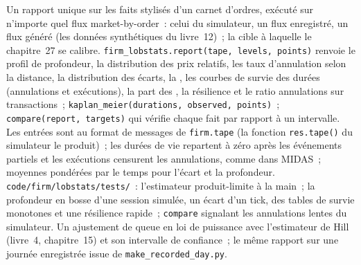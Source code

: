\begin{build}
 Un rapport unique sur les faits stylisés d'un carnet d'ordres, exécuté sur n'importe quel flux market-by-order~: celui du simulateur, un flux enregistré, un flux généré
(les données synthétiques du livre~12)~; la cible à laquelle le chapitre~27 se calibre.
 \texttt{firm\_lobstats.report(tape, levels, points)} renvoie le profil de profondeur, la distribution des prix relatifs,
les taux d'annulation selon la distance, la distribution des écarts, la , les courbes de survie des durées (annulations et exécutions), la part des ,
la résilience et le ratio annulations sur transactions~; \texttt{kaplan\_meier(durations, observed, points)}~; \texttt{compare(report, targets)} qui vérifie chaque fait
par rapport à un intervalle.
 Les entrées sont au format de messages de \texttt{firm.tape} (la fonction \texttt{res.tape()} du simulateur le produit)~; les durées de vie repartent à zéro après les événements partiels et
les exécutions censurent les annulations, comme dans MIDAS~; moyennes pondérées par le temps pour l'écart et la profondeur.
 \texttt{code/firm/lobstats/tests/}~: l'estimateur produit-limite à la main~; la profondeur en bosse d'une session simulée, un écart d'un tick, des tables de survie
monotones et une résilience rapide~; \texttt{compare} signalant les annulations lentes du simulateur.
 Un ajustement de queue en loi de puissance avec l'estimateur de Hill (livre~4, chapitre~15) et son intervalle de confiance~; le même rapport sur une
journée enregistrée issue de \texttt{make\_recorded\_day.py}.
\end{build}

